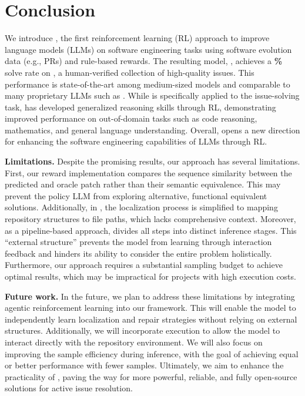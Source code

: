 \section{Conclusion}
\label{section:conclusion}


We introduce \tech, the first reinforcement learning (RL) approach to improve language models (LLMs) on software engineering tasks using software evolution data (e.g., PRs) and rule-based rewards.
The resulting model, \ours[70], achieves a \textbf{\swebfinalbig{}\%} solve rate on \swebverified, a human-verified collection of high-quality \github issues.
This performance is state-of-the-art among medium-sized models and comparable to many proprietary LLMs such as .
While \tech is specifically applied to the issue-solving task, \ours has developed generalized reasoning skills through RL, demonstrating improved performance on out-of-domain tasks such as code reasoning, mathematics, and general language understanding.
Overall, \tech opens a new direction for enhancing the software engineering capabilities of LLMs through RL.


\textbf{Limitations.}
Despite the promising results, our approach has several limitations.
First, our reward implementation compares the sequence similarity between the predicted and oracle patch rather than their semantic equivalence. This may prevent the policy LLM from exploring alternative, functional equivalent solutions.
Additionally, in \ouragentless, the localization process is simplified to mapping repository structures to file paths, which lacks comprehensive context.
Moreover, as a pipeline-based approach, \ouragentless divides all steps into distinct inference stages. This ``external structure'' prevents the model from learning through interaction feedback and hinders its ability to consider the entire problem holistically.
Furthermore, our approach requires a substantial sampling budget to achieve optimal results, which may be impractical for projects with high execution costs.


\textbf{Future work.}
In the future, we plan to address these limitations by integrating agentic reinforcement learning into our framework. This will enable the model to independently learn localization and repair strategies without relying on external structures.
Additionally, we will incorporate execution to allow the model to interact directly with the repository environment.
We will also focus on improving the sample efficiency during inference, with the goal of achieving equal or better performance with fewer samples.
Ultimately, we aim to enhance the practicality of \tech, paving the way for more powerful, reliable, and fully open-source solutions for active \github issue resolution.



